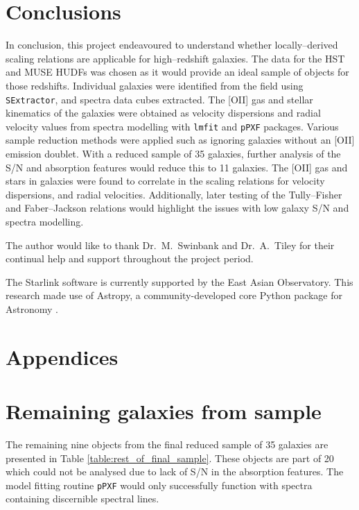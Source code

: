 \documentclass[12pt, twocolumn, nofootinbib]{revtex4-1}    %
\begin{document}
\vspace{2ex} %
\section{Conclusions} \label{sec:conclusions}
\noindent
In conclusion, this project endeavoured to understand whether locally--derived scaling relations are applicable for high--redshift galaxies. The data for the HST and MUSE HUDFs was chosen as it would provide an ideal sample of objects for those redshifts. Individual galaxies were identified from the field using \texttt{SExtractor}, and spectra data cubes extracted. The [OII] gas and stellar kinematics of the galaxies were obtained as velocity dispersions and radial velocity values from spectra modelling with \texttt{lmfit} and \texttt{pPXF} packages. Various sample reduction methods were applied such as ignoring galaxies without an [OII] emission doublet. With a reduced sample of 35 galaxies, further analysis of the S/N and absorption features would reduce this to 11 galaxies. The [OII] gas and stars in galaxies were found to correlate in the scaling relations for velocity dispersions, and radial velocities. Additionally, later testing of the Tully--Fisher and Faber--Jackson relations would highlight the issues with low galaxy S/N and spectra modelling.

\vspace{2ex} %
\begin{acknowledgments}
\noindent
The author would like to thank Dr.~M.~Swinbank and Dr.~A.~Tiley for their continual help and support throughout the project period.

The Starlink software \cite{2014ASPC..485..391C} is currently supported by the East Asian Observatory. This research made use of Astropy, a community-developed core Python package for Astronomy \citep{astropy:2013, astropy:2018}.
\end{acknowledgments}

\vspace{2ex} %



\clearpage

\appendix

\onecolumngrid
\section*{Appendices}
\section{Remaining galaxies from sample} \label{appendix:rest_of_final_sample}
\noindent
The remaining nine objects from the final reduced sample of 35 galaxies are presented in Table \ref{table:rest_of_final_sample}. These objects are part of 20 which could not be analysed due to lack of S/N in the absorption features. The model fitting routine \texttt{pPXF} would only successfully function with spectra containing discernible spectral lines. \\
\end{document}
